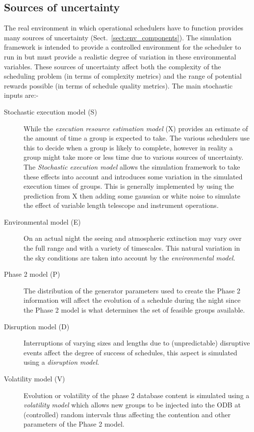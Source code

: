 \subsection{Sources of uncertainty}
\label{sect:exp_uncertainty}
The real environment in which operational schedulers have to function provides many sources of uncertainty (Sect.~\ref{sect:env_components}). The simulation framework is intended to provide a controlled environment for the scheduler to run in but must provide a realistic degree of variation in these environmental variables. These sources of uncertainty affect both the complexity of the scheduling problem (in terms of complexity metrics) and the range of potential rewards possible (in terms of schedule quality metrics). The main stochastic inputs are:-

\begin{description}
\item [Stochastic execution model (S)] While the \emph{execution resource estimation model} (X) provides an estimate of the amount of time a group is expected to take. The various schedulers use this to decide when a group is likely to complete, however in reality a group might take more or less time due to various sources of uncertainty. The \emph{Stochastic execution model} allows the simulation framework to take these effects into account and introduces some variation in the simulated execution times of groups. This is generally implemented by using the prediction from X then adding some gaussian or white noise to simulate the effect of variable length telescope and instrument operations.

\item [Environmental model (E)] On an actual night the seeing and atmospheric extinction may vary over the full range and with a variety of timescales. This natural variation in the sky conditions are taken into account by the \emph{environmental model}.

\item [Phase 2 model (P)] The distribution of the generator parameters used to create the Phase 2 information will affect the evolution of a schedule during the night since the Phase 2 model is what determines the set of feasible groups available.

\item [Disruption model (D)] Interruptions of varying sizes and lengths due to (unpredictable) disruptive events affect the degree of success of schedules, this aspect is simulated using a \emph{disruption model}.

\item [Volatility model (V)] Evolution or volatility of the phase 2 database content is simulated using a \emph{volatility model} which allows new groups to be injected into the ODB at (controlled) random intervals thus affecting the contention and other parameters of the Phase 2 model.

\end{description}


